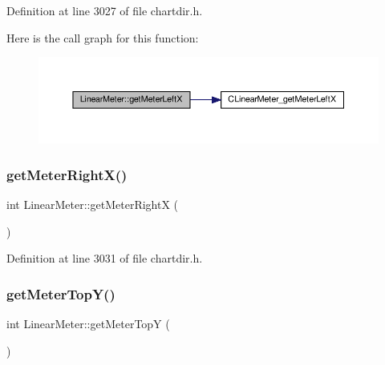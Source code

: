 Definition at line 3027 of file chartdir.\+h.

Here is the call graph for this function\+:
\nopagebreak
\begin{figure}[H]
\begin{center}
\leavevmode
\includegraphics[width=350pt]{class_linear_meter_ab75f2dce6013211e5a241a13205263ef_cgraph}
\end{center}
\end{figure}
\mbox{\label{class_linear_meter_a78ffbad85d01ed2fde40342f49901288}} 
\subsubsection{\texorpdfstring{get\+Meter\+Right\+X()}{getMeterRightX()}}
{\footnotesize\ttfamily int Linear\+Meter\+::get\+Meter\+RightX (\begin{DoxyParamCaption}{ }\end{DoxyParamCaption})\hspace{0.3cm}{\ttfamily [inline]}}



Definition at line 3031 of file chartdir.\+h.

\mbox{\label{class_linear_meter_a9122149ef99dd2abc325af75f8f4e284}} 
\subsubsection{\texorpdfstring{get\+Meter\+Top\+Y()}{getMeterTopY()}}
{\footnotesize\ttfamily int Linear\+Meter\+::get\+Meter\+TopY (\begin{DoxyParamCaption}{ }\end{DoxyParamCaption})\hspace{0.3cm}{\ttfamily [inline]}}



